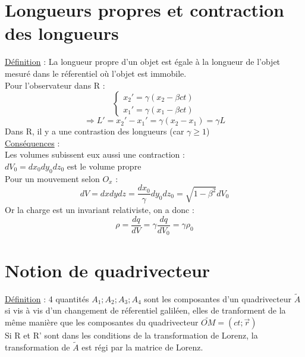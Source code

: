 \documentclass{article}
\begin{document}
\section{Longueurs propres et contraction des longueurs}
\underline{Définition} : La longueur propre d'un objet est égale à la longueur de l'objet mesuré dans le réferentiel où l'objet est immobile.\\
Pour l'observateur dans R :\\
\[
\begin{cases}
    x_2' = \gamma(x_2 - \beta ct) \\
    x_1' = \gamma(x_1 - \beta ct)
\end{cases}
\]
\begin{equation*}
    \Rightarrow L' = x_2' - x_1' = \gamma (x_2-x_1) = \gamma L
\end{equation*}
Dans R, il y a une contrastion des longueurs (car $\gamma \geq 1$)\\
\underline{Conséquences} : \\
Les volumes subissent eux aussi une contraction : \\
$dV_0 = dx_0dy_0dz_0$ est le volume propre\\
Pour un mouvement selon $O_x$ : 
\begin{equation*}
   dV = dxdydz = \frac{dx_0}{\gamma}dy_0dz_0 = \sqrt{1-\beta^2}dV_0
\end{equation*}
Or la charge est un invariant relativiste, on a donc : 
\begin{equation*}
    \rho = \frac{dq}{dV} = \gamma \frac{dq}{dV_0} = \gamma \rho_0
\end{equation*}

\section{Notion de quadrivecteur}
\underline{Définition} : 4 quantités $A_1;A_2;A_3;A_4$ sont les composantes d'un quadrivecteur $\tilde{A}$ si vis à vis d'un changement de réferentiel galiléen, elles de tranforment de la même manière que les composantes du quadrivecteur $\tilde{OM} = (ct;\vec{r})$ \\
Si R et R' sont dans les conditions de la transformation de Lorenz, la transformation de $\tilde{A}$ est régi par la matrice de Lorenz.\\
\end{document}
